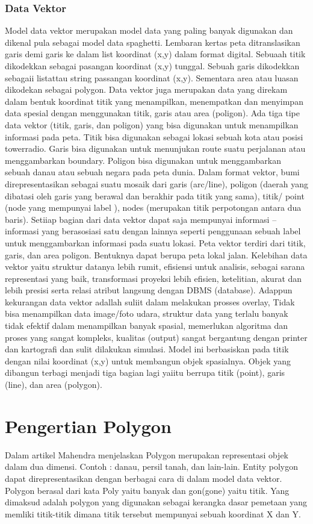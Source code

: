 \subsubsection{Data Vektor}
Model data vektor merupakan model data yang paling banyak digunakan dan dikenal pula sebagai model data spaghetti. Lembaran kertas peta ditranslasikan garis demi garis ke dalam list koordinat (x,y) dalam format digital. Sebuaah titik dikodekkan sebagai pasangan koordinat (x,y) tunggal. Sebuah garis dikodekkan sebagaii listattau string passangan koordinat (x,y). Sementara area atau luasan dikodekan sebagai polygon. Data vektor juga merupakan data yang direkam dalam bentuk koordinat titik yang menampilkan, menempatkan dan menyimpan data spesial dengan menggunakan titik, garis atau area (poligon). Ada tiga tipe data vektor (titik, garis, dan poligon) yang bisa digunakan untuk menampilkan informasi pada peta. Titik bisa digunakan sebagai lokasi sebuah kota atau posisi towerradio. Garis bisa digunakan untuk menunjukan route suatu perjalanan atau menggambarkan boundary. Poligon bisa digunakan untuk menggambarkan sebuah danau atau sebuah negara pada peta dunia. Dalam format vektor, bumi direpresentasikan sebagai suatu mosaik dari garis (arc/line), poligon (daerah yang dibatasi oleh garis yang berawal dan berakhir pada titik yang sama), titik/ point (node yang mempunyai label ), nodes (merupakan titik perpotongan antara dua baris). Setiiap bagian dari data vektor dapat saja mempunyai informasi – informasi yang berasosiasi satu dengan lainnya seperti penggunaan sebuah label untuk menggambarkan informasi pada suatu lokasi. Peta vektor terdiri dari titik, garis, dan area poligon. Bentuknya dapat berupa peta lokal jalan. Kelebihan data vektor yaitu struktur datanya lebih rumit, efisiensi untuk analisis, sebagai sarana representasi yang baik, transformasi proyeksi lebih efisien, ketelitian, akurat dan lebih presisi serta relasi atribut langsung dengan DBMS (database). Adappun kekurangan data vektor adallah suliit dalam melakukan prosses overlay, Tidak bisa menampilkan data image/foto udara, struktur data yang terlalu banyak tidak efektif dalam menampilkan banyak spasial, memerlukan algoritma dan proses yang sangat kompleks, kualitas (output) sangat bergantung dengan printer dan kartografi dan sulit dilakukan simulasi.
Model ini berbasiskan pada titik dengan nilai koordinat (x,y) untuk membangun objek spasialnya. Objek yang dibangun terbagi menjadi tiga bagian lagi yaiitu berrupa titik (point), garis (line), dan area (polygon).

 
\section{Pengertian Polygon}
Dalam artikel Mahendra menjelaskan Polygon merupakan representasi objek dalam dua dimensi. Contoh : danau,
persil tanah, dan lain-lain. Entity polygon dapat direpresentasikan dengan berbagai cara di dalam model data vektor. 
Polygon berasal dari kata Poly yaitu banyak dan gon(gone) yaitu titik. Yang dimaksud adalah polygon yang digunakan sebagai kerangka dasar pemetaan yang memliki titik-titik dimana titik tersebut mempunyai sebuah koordinat X dan Y. 


